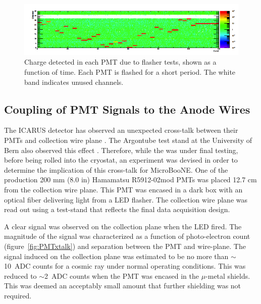 \begin{figure}
\centering 
\includegraphics[width=\textwidth]{./figures/flasherresult.png}
\caption{Charge detected in each PMT due to flasher tests, shown as a function of time.  Each PMT is flashed for a short period. The white band indicates unused channels. \label{fig:flasherresult}  }
\end{figure}



\subsection{Coupling of PMT Signals to the Anode Wires}


The ICARUS detector has observed an unexpected cross-talk between their PMTs and collection wire plane \cite{Ankowski:2008aa}. The Argontube test stand at the University of Bern also observed this effect \cite{BernPrivate}.   Therefore, while the \lartpc was under final testing, before being rolled into the cryostat, an experiment was devised in order to determine the implication of this cross-talk for MicroBooNE.  One of the production 200 mm (8.0 in) Hamamatsu R5912-02mod PMTs was placed 12.7 cm from the \lartpc collection wire plane. This PMT was encased in a dark box with an optical fiber delivering light from a LED flasher. The collection wire plane was read out using a test-stand that reflects the final data acquisition design.

A clear signal was observed on the collection plane when the LED fired. The magnitude of the signal was characterized as a function of photo-electron count (figure~\ref{fig:PMTxtalk}) and separation between the PMT and wire-plane. The signal induced on the collection plane was estimated to be no more than $\sim$10~ADC counts for a cosmic ray under normal operating conditions. This was reduced to $\sim$2~ADC counts when the PMT was encased in the $\mu$-metal shields. This was deemed an acceptably small amount that further shielding was not required.

